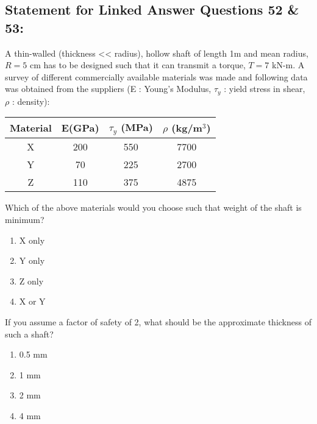 \subsection*{Statement for Linked Answer Questions 52 \& 53:}
A thin-walled (thickness << radius), hollow shaft of length 1m and mean radius, $R = 5$ cm has to be designed such that it can transmit a torque, $T = 7$ kN-m. A survey of different commercially available materials was made and following data was obtained from the suppliers (E : Young's Modulus, $\tau_y$ : yield stress in shear, $\rho$ : density):
\begin{table}[H]
    \centering
    \begin{tabular}{| c | c | c | c |}
    \hline
        Material  &  E(GPa) & $\tau_y$ (MPa) & $\rho$ (kg/m$^3$)\\
    \hline
        X & 200 & 550 & 7700\\ 
    \hline
        Y & 70 & 225 & 2700\\ 
    \hline
        Z & 110 & 375 & 4875\\ 
    \hline
    \end{tabular}
\end{table}
\item Which of the above materials would you choose such that weight of the shaft is minimum?
\begin{multicols}{2}
    \begin{enumerate}
        \item X only
        \item Y only
        \item Z only
        \item X or Y
    \end{enumerate}
\end{multicols}
\item If you assume a factor of safety of 2, what should be the approximate thickness of such a shaft?
\begin{multicols}{2}
    \begin{enumerate}
        \item 0.5 mm
        \item 1 mm
        \item 2 mm
        \item 4 mm
    \end{enumerate}
\end{multicols}
